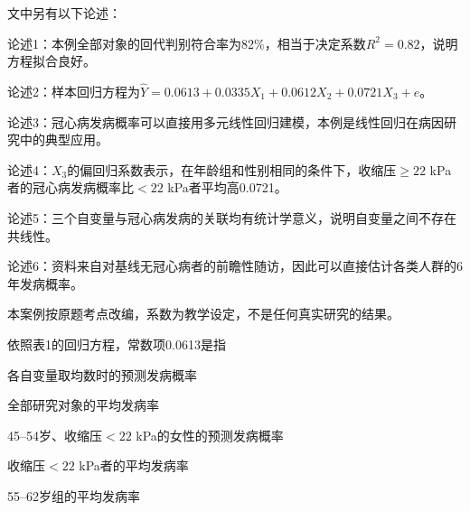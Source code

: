 文中另有以下论述：

论述1：本例全部对象的回代判别符合率为82\%，相当于决定系数\(R^2=0.82\)，说明方程拟合良好。

论述2：样本回归方程为\(\hat Y=0.0613+0.0335X_1+0.0612X_2+0.0721X_3+e\)。

论述3：冠心病发病概率可以直接用多元线性回归建模，本例是线性回归在病因研究中的典型应用。

论述4：\(X_3\)的偏回归系数表示，在年龄组和性别相同的条件下，收缩压\(\ge22\) kPa者的冠心病发病概率比\(<22\) kPa者平均高0.0721。

论述5：三个自变量与冠心病发病的关联均有统计学意义，说明自变量之间不存在共线性。

论述6：资料来自对基线无冠心病者的前瞻性随访，因此可以直接估计各类人群的6年发病概率。

本案例按原题考点改编，系数为教学设定，不是任何真实研究的结果。

\par\addvspace{6pt}\noindent\begin{minipage}{\linewidth}


依照表1的回归方程，常数项0.0613是指

\begin{choices}

\item 各自变量取均数时的预测发病概率

\item 全部研究对象的平均发病率

\item 45--54岁、收缩压\(<22\) kPa的女性的预测发病概率

\item 收缩压\(<22\) kPa者的平均发病率

\item 55--62岁组的平均发病率

\end{choices}

\end{minipage}\par\vspace{4pt}

